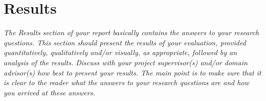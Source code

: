 \section{Results} 

\emph{The Results section of your report basically contains the answers to your research questions. This section should present the results of your evaluation, provided quantitatively, qualitatively and/or visually, as appropriate, followed by an analysis of the results. Discuss with your project supervisor(s) and/or domain advisor(s) how best to present your results. The main point is to make sure that it is clear to the reader what the answers to your research questions are and how you arrived at these answers.}
